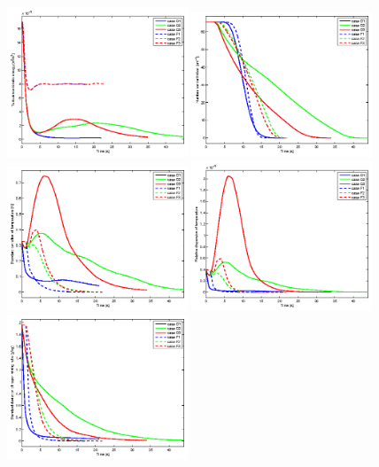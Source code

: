\documentclass[draft,jgrga]{AGUTeX}
\begin{document}
\begin{article}
\begin{figure}\centering
\includegraphics[width=0.48\textwidth]{Figures/tke}
\includegraphics[width=0.48\textwidth]{Figures/num_con}\\
\includegraphics[width=0.48\textwidth]{Figures/temp_std}
\includegraphics[width=0.48\textwidth]{Figures/temp_dsp}\\
\includegraphics[width=0.48\textwidth]{Figures/vapor_std}

\end{figure}
\end{article}
\end{document}
